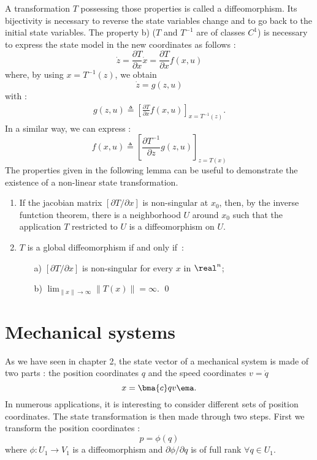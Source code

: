 A transformation $T$ possessing those properties is called a diffeomorphism. Its bijectivity is necessary to reverse the state variables change and to go back to the initial state variables.
The property b)  ($T$ and $T^{-1}$ are of classes $C^1$) is necessary to express the state model in the new coordinates as follows :
$$
\dot z = \frac{\partial T}{\partial x} \dot x = \frac{\partial
T}{\partial x} f(x, u)
$$
where, by using $x = T^{-1}(z)$, we obtain
$$
\dot z = g(z,u)
$$
with :
\begin{equation*} \begin{split} 
g(z,u) \triangleq \left[ \frac{\partial T}{\partial x}
f(x,u)\right ]_{x = T^{-1}(z)}.
\end{split} \end{equation*}
In a similar way, we can express :
$$
f(x,u) \triangleq \left[\frac{\partial T^{-1}}{\partial z}
g(z,u)\right ]_{z = T(x)}
$$
The properties given in the following lemma can be useful to demonstrate the existence of a non-linear state transformation. 
\begin{lemme}{\blanc}
\begin{enumerate}
\item If the jacobian matrix $[\partial T/\partial x]$ is non-singular at $x_0$, then, by the inverse funtction theorem, there is a neighborhood $U$ around $x_0$ such that the application $T$ restricted to $U$ is a diffeomorphism on $U$.
\item $T$ is a global diffeomorphism if and only if~:
\begin{itemize}
\item[a)] $[\partial T/\partial x]$ is non-singular for every $x$ in $\real^n$;
\item[b)] $\lim_{\|x\|\rightarrow\infty}\|T(x)\| = \infty$. \qed
\end{itemize}
\end{enumerate}
\end{lemme}

\section{Mechanical systems}

As we have seen in chapter 2, the state vector of a mechanical system is made of two parts : the position coordinates $q$ and the speed coordinates
$v=\dot q$
$$ x = \bma{c} q \\ v \ema. $$
In numerous applications, it is interesting to consider different sets of position coordinates. The state transformation is then made through two steps. First we transform the position coordinates :
$$ p = \phi (q)$$
where $\phi : U_1 \rightarrow V_1$ is a diffeomorphism and 
$\partial \phi /\partial q$ is of full rank $\forall q \in U_1$.

